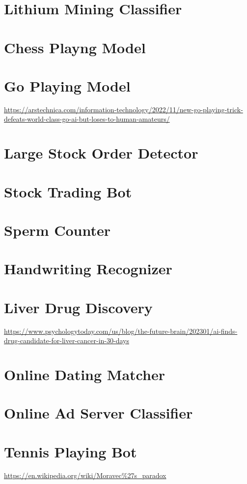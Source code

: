 \section{Lithium Mining Classifier}
\section{Chess Playng Model}
\section{Go Playing Model}

\url{https://arstechnica.com/information-technology/2022/11/new-go-playing-trick-defeats-world-class-go-ai-but-loses-to-human-amateurs/}

\section{Large Stock Order Detector}
\section{Stock Trading Bot}
\section{Sperm Counter}
\section{Handwriting Recognizer}
\section{Liver Drug Discovery}

\url{https://www.psychologytoday.com/us/blog/the-future-brain/202301/ai-finds-drug-candidate-for-liver-cancer-in-30-days}

\section{Online Dating Matcher}
\section{Online Ad Server Classifier}
\section{Tennis Playing Bot}

\url{https://en.wikipedia.org/wiki/Moravec\%27s_paradox}

